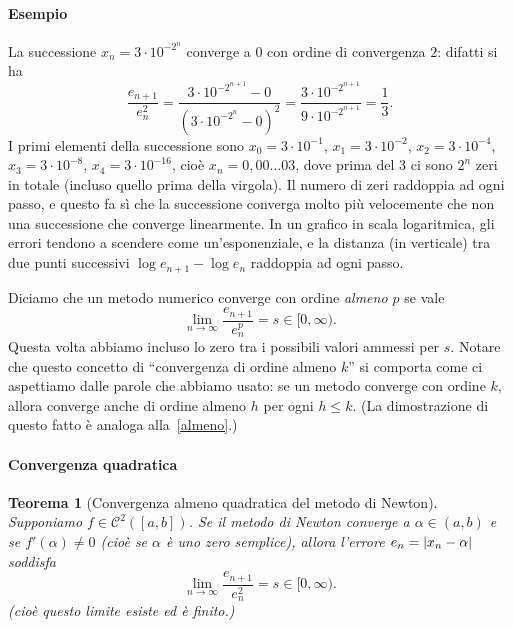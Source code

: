 \documentclass[a4paper]{report}
\DeclarePairedDelimiter{\abs}{\lvert}{\rvert}
\newtheorem{theorem}{Teorema}[chapter]
\theoremstyle{definiton}
\theoremstyle{remark}
\begin{document}
\paragraph{Esempio} La successione $x_n = 3\cdot 10^{-2^n}$ converge a $0$ con ordine di convergenza $2$: difatti si ha
\[
\frac{e_{n+1}}{e_n^2} = \frac{3\cdot 10^{-2^{n+1}}-0}{(3\cdot 10^{-2^n} - 0)^2} = \frac{3\cdot 10^{-2^{n+1}}}{9\cdot 10^{-2^{n+1}}} = \frac13.
\]
I primi elementi della successione sono $x_0 = 3\cdot 10^{-1}$, $x_1 = 3\cdot 10^{-2}$, $x_2 = 3\cdot 10^{-4}$, $x_3 = 3\cdot 10^{-8}$, $x_4 = 3\cdot 10^{-16}$, cioè $x_n = 0,00\dots03$, dove prima del $3$ ci sono $2^n$ zeri in totale (incluso quello prima della virgola). Il numero di zeri raddoppia ad ogni passo, e questo fa sì che la successione converga molto più velocemente che non una successione che converge linearmente. In un grafico in scala logaritmica, gli errori tendono a scendere come un'esponenziale, e la distanza (in verticale) tra due punti successivi $\log e_{n+1} - \log e_n$ raddoppia ad ogni passo.

Diciamo che un metodo numerico converge con ordine \emph{almeno $p$} se vale
\[
\lim_{n \to \infty }\frac{e_{n+1}}{e_n^p} = s \in [0,\infty).
\]
Questa volta abbiamo incluso lo zero tra i possibili valori ammessi per $s$. Notare che questo concetto di ``convergenza di ordine almeno $k$'' si comporta come ci aspettiamo dalle parole che abbiamo usato: se un metodo converge con ordine $k$, allora converge anche di ordine almeno $h$ per ogni $h\leq k$. (La dimostrazione di questo fatto è analoga alla~\eqref{almeno}.)

\paragraph{Convergenza quadratica} \begin{theorem}[Convergenza almeno quadratica del metodo di Newton] \label{thm:convnewton}
Supponiamo $f \in \mathcal{C}^2([a,b])$. Se il metodo di Newton converge a $\alpha \in (a,b)$ e se $f'(\alpha) \neq 0$ (cioè se $\alpha$ è uno \emph{zero semplice}), allora l'errore $e_n = \abs{x_n - \alpha}$ soddisfa
\[
\lim_{n\to \infty} \frac{e_{n+1}}{e_n^2} = s \in [0,\infty).
\]
(cioè questo limite esiste ed è finito.)
\end{theorem}
\end{document}
